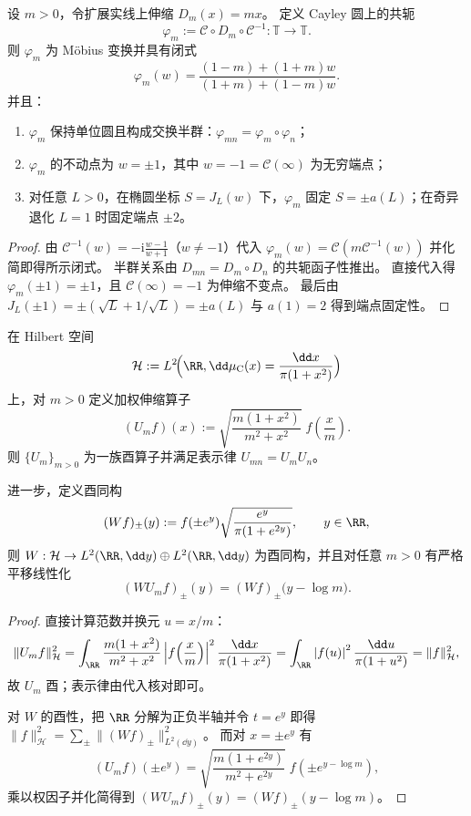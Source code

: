\begin{theorem}\label{thm:xi-cayley-dilation-mobius-conjugacy-fixedpoints}
设 \(m>0\)，令扩展实线上伸缩 \(D_m(x)=mx\)。
定义 Cayley 圆上的共轭
\[
\varphi_m:=\mathcal C\circ D_m\circ\mathcal C^{-1}:\mathbb T\to\mathbb T.
\]
则 \(\varphi_m\) 为 Möbius 变换并具有闭式
\[
\varphi_m(w)=\frac{(1-m)+(1+m)w}{(1+m)+(1-m)w}.
\]
并且：
\begin{enumerate}
  \item \(\varphi_m\) 保持单位圆且构成交换半群：\(\varphi_{mn}=\varphi_m\circ\varphi_n\)；
  \item \(\varphi_m\) 的不动点为 \(w=\pm 1\)，其中 \(w=-1=\mathcal C(\infty)\) 为无穷端点；
  \item 对任意 \(L>0\)，在椭圆坐标 \(S=J_L(w)\) 下，\(\varphi_m\) 固定 \(S=\pm a(L)\)；在奇异退化 \(L=1\) 时固定端点 \(\pm 2\)。
\end{enumerate}
\end{theorem}
\begin{proof}
由 \(\mathcal C^{-1}(w)=-\mathrm{i}\frac{w-1}{w+1}\)（\(w\neq -1\)）代入 \(\varphi_m(w)=\mathcal C(m\mathcal C^{-1}(w))\) 并化简即得所示闭式。
半群关系由 \(D_{mn}=D_m\circ D_n\) 的共轭函子性推出。
直接代入得 \(\varphi_m(\pm 1)=\pm 1\)，且 \(\mathcal C(\infty)=-1\) 为伸缩不变点。
最后由 \(J_L(\pm 1)=\pm(\sqrt{L}+1/\sqrt{L})=\pm a(L)\) 与 \(a(1)=2\) 得到端点固定性。
\end{proof}

\begin{theorem}\label{thm:xi-cauchy-cosh-unitary-linearization}
在 Hilbert 空间
\[
\mathcal H:=L^2\!\Bigl(\RR,\dd\mu_{\mathrm C}(x)=\frac{\dd x}{\pi(1+x^2)}\Bigr)
\]
上，对 \(m>0\) 定义加权伸缩算子
\[
(U_m f)(x):=\sqrt{\frac{m(1+x^2)}{m^2+x^2}}\;f\!\left(\frac{x}{m}\right).
\]
则 \(\{U_m\}_{m>0}\) 为一族酉算子并满足表示律 \(U_{mn}=U_mU_n\)。
\par
进一步，定义酉同构
\[
(Wf)_\pm(y):=f(\pm e^{y})\sqrt{\frac{e^{y}}{\pi(1+e^{2y})}},\qquad y\in\RR,
\]
则
\(
W:\mathcal H\to L^2(\RR,\dd y)\oplus L^2(\RR,\dd y)
\)
为酉同构，并且对任意 \(m>0\) 有严格平移线性化
\[
(WU_m f)_\pm(y)=(Wf)_\pm\bigl(y-\log m\bigr).
\]
\end{theorem}
\begin{proof}
直接计算范数并换元 \(u=x/m\)：
\[
\|U_m f\|_{\mathcal H}^2
=\int_{\RR}\frac{m(1+x^2)}{m^2+x^2}\left|f\!\left(\frac{x}{m}\right)\right|^2\frac{\dd x}{\pi(1+x^2)}
=\int_{\RR}\left|f(u)\right|^2\frac{\dd u}{\pi(1+u^2)}
=\|f\|_{\mathcal H}^2,
\]
故 \(U_m\) 酉；表示律由代入核对即可。
\par
对 \(W\) 的酉性，把 \(\RR\) 分解为正负半轴并令 \(t=e^{y}\) 即得
\(
\|f\|_{\mathcal H}^2=\sum_\pm\|(Wf)_\pm\|_{L^2(\dd y)}^2
\)。
而对 \(x=\pm e^{y}\) 有
\[
(U_m f)(\pm e^{y})
=\sqrt{\frac{m(1+e^{2y})}{m^2+e^{2y}}}\;f(\pm e^{y-\log m}),
\]
乘以权因子并化简得到 \((WU_m f)_\pm(y)=(Wf)_\pm(y-\log m)\)。
\end{proof}

